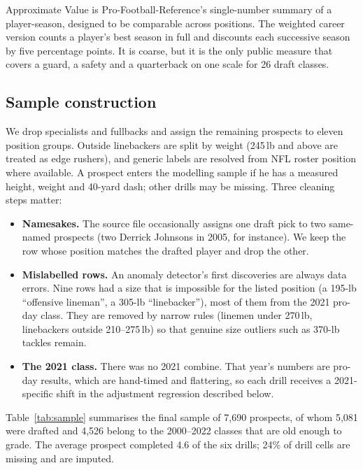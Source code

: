 \documentclass[11pt]{article}
\begin{document}
Approximate Value \cite{drinen} is Pro-Football-Reference's single-number summary of a player-season, designed to be comparable across positions. The weighted career version counts a player's best season in full and discounts each successive season by five percentage points. It is coarse, but it is the only public measure that covers a guard, a safety and a quarterback on one scale for 26 draft classes.

\subsection{Sample construction}

We drop specialists and fullbacks and assign the remaining prospects to eleven position groups. Outside linebackers are split by weight (245\,lb and above are treated as edge rushers), and generic labels are resolved from NFL roster position where available. A prospect enters the modelling sample if he has a measured height, weight and 40-yard dash; other drills may be missing. Three cleaning steps matter:

\begin{itemize}[leftmargin=1.4em]
\item \textbf{Namesakes.} The source file occasionally assigns one draft pick to two same-named prospects (two Derrick Johnsons in 2005, for instance). We keep the row whose position matches the drafted player and drop the other.
\item \textbf{Mislabelled rows.} An anomaly detector's first discoveries are always data errors. Nine rows had a size that is impossible for the listed position (a 195-lb ``offensive lineman'', a 305-lb ``linebacker''), most of them from the 2021 pro-day class. They are removed by narrow rules (linemen under 270\,lb, linebackers outside 210--275\,lb) so that genuine size outliers such as 370-lb tackles remain.
\item \textbf{The 2021 class.} There was no 2021 combine. That year's numbers are pro-day results, which are hand-timed and flattering, so each drill receives a 2021-specific shift in the adjustment regression described below.
\end{itemize}

Table~\ref{tab:sample} summarises the final sample of 7,690 prospects, of whom 5,081 were drafted and 4,526 belong to the 2000--2022 classes that are old enough to grade. The average prospect completed 4.6 of the six drills; 24\% of drill cells are missing and are imputed.
\end{document}
